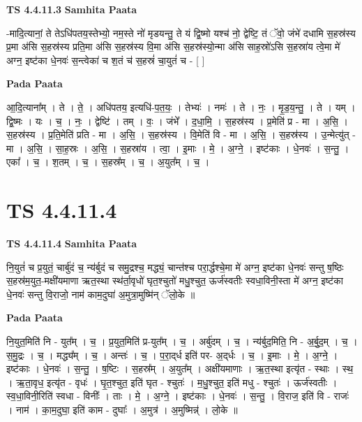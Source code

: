 \documentclass[17pt]{extarticle}
\begin{document}
\textbf{TS 4.4.11.3 } \newline
\textbf{Samhita Paata} \newline

-मादि॒त्यानां॒ ते तेऽधि॑पतय॒स्तेभ्यो॒ नम॒स्ते नो॑ मृडयन्तु॒ ते यं द्वि॒ष्मो यश्च॑ नो॒ द्वेष्टि॒ तं ॅवो॒ जंभे॑ दधामि स॒हस्र॑स्य प्र॒मा अ॑सि स॒हस्र॑स्य प्रति॒मा अ॑सि स॒हस्र॑स्य वि॒मा अ॑सि स॒हस्र॑स्यो॒न्मा अ॑सि साह॒स्रो॑ऽसि स॒हस्रा॑य त्वे॒मा मे॑ अग्न॒ इष्ट॑का धे॒नवः॑ स॒न्त्वेका॑ च श॒तं च॑ स॒हस्रं॑ चा॒युतं॑ च - [  ] \newline

\textbf{Pada Paata} \newline

आ॒दि॒त्याना᳚म् । ते । ते॒ । अधि॑पतय॒ इत्यधि॑-प॒त॒यः॒ । तेभ्यः॑ । नमः॑ । ते । नः॒ । मृ॒ड॒य॒न्तु॒ । ते । यम् । द्वि॒ष्मः । यः । च॒ । नः॒ । द्वेष्टि॑ । तम् । वः॒ । जंभे᳚ । द॒धा॒मि॒ । स॒हस्र॑स्य । प्र॒मेति॑ प्र - मा । अ॒सि॒ । स॒हस्र॑स्य । प्र॒ति॒मेति॑ प्रति - मा । अ॒सि॒ । स॒हस्र॑स्य । वि॒मेति॑ वि - मा । अ॒सि॒ । स॒हस्र॑स्य । उ॒न्मेत्यु॑त् - मा । अ॒सि॒ । सा॒ह॒स्रः । अ॒सि॒ । स॒हस्रा॑य । त्वा॒ । इ॒माः । मे॒ । अ॒ग्ने॒ । इष्ट॑काः । धे॒नवः॑ । स॒न्तु॒ । एका᳚ । च॒ । श॒तम् । च॒ । स॒हस्र᳚म् । च॒ । अ॒युत᳚म् । च॒ ।  \newline





\section{ TS 4.4.11.4 }

\textbf{TS 4.4.11.4 } \newline
\textbf{Samhita Paata} \newline

नि॒युतं॑ च प्र॒युतं॒ चार्बु॑दं च॒ न्य॑र्बुदं च समु॒द्रश्च॒ मद्ध्यं॒ चान्त॑श्च परा॒र्द्धश्चे॒मा मे॑ अग्न॒ इष्ट॑का धे॒नवः॑ सन्तु ष॒ष्ठिः स॒हस्र॑म॒युत॒-मक्षी॑यमाणा ऋत॒स्था स्थ॑र्ता॒वृधो॑ घृत॒श्चुतो॑ मधु॒श्चुत॒ ऊर्ज॑स्वतीः स्वधा॒विनी॒स्ता मे॑ अग्न॒ इष्ट॑का धे॒नवः॑ सन्तु वि॒राजो॒ नाम॑ काम॒दुघा॑ अ॒मुत्रा॒मुष्मि॑न् ॅलो॒के ॥ \newline

\textbf{Pada Paata} \newline

नि॒युत॒मिति॑ नि - युत᳚म् । च॒ । प्र॒युत॒मिति॑ प्र-युत᳚म् । च॒ । अर्बु॑दम् । च॒ । न्य॑र्बुद॒मिति॒ नि - अ॒र्बु॒द॒म् । च॒ । स॒मु॒द्रः । च॒ । मद्ध्य᳚म् । च॒ । अन्तः॑ । च॒ । प॒रा॒द्‌र्ध इति॑ पर- अ॒द्‌र्धः । च॒ । इ॒माः । मे॒ । अ॒ग्ने॒ । इष्ट॑काः । धे॒नवः॑ । स॒न्तु॒ । ष॒ष्टिः । स॒हस्र᳚म् । अ॒युत᳚म् । अक्षी॑यमाणाः । ऋ॒त॒स्था इत्यृ॑त - स्थाः । स्थ॒ । ऋ॒ता॒वृध॒ इत्यृ॑त - वृधः॑ । घृ॒त॒श्चुत॒ इति॑ घृत - श्चुतः॑ । म॒धु॒श्चुत॒ इति॑ मधु - श्चुतः॑ । ऊर्ज॑स्वतीः । स्व॒धा॒विनी॒रिति॑ स्वधा - विनीः᳚ । ताः । मे॒ । अ॒ग्ने॒ । इष्ट॑काः । धे॒नवः॑ । स॒न्तु॒ । वि॒राज॒ इति॑ वि - राजः॑ । नाम॑ । का॒म॒दुघा॒ इति॑ काम - दुघाः᳚ । अ॒मुत्र॑ । अ॒मुष्मिन्न्॑ । लो॒के ॥  \newline
\end{document}
